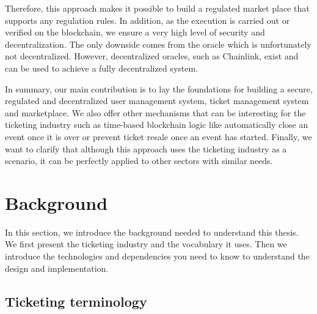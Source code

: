 \documentclass[a4paper,11pt,oneside]{report}
\begin{document}
Therefore, this approach makes it possible to build a regulated market place that supports any regulation rules. In addition, as the execution is carried out or verified on the blockchain, we ensure a very high level of security and decentralization. The only downside comes from the oracle which is unfortunately not decentralized. However, decentralized oracles, such as Chainlink, exist and can be used to achieve a fully decentralized system.

In summary, our main contribution is to lay the foundations for building a secure, regulated and decentralized user management system, ticket management system and marketplace. We also offer other mechanisms that can be interesting for the ticketing industry such as time-based blockchain logic like automatically close an event once it is over or prevent ticket resale once an event has started. Finally, we want to clarify that although this approach uses the ticketing industry as a scenario, it can be perfectly applied to other sectors with similar needs.

\chapter{Background}
In this section, we introduce the background needed to understand this thesis. We first present the ticketing industry and the vocabulary it uses. Then we introduce the technologies and dependencies you need to know to understand the design and implementation.

\section{Ticketing terminology}
\label{sec:ticketing_terminology}
\end{document}

